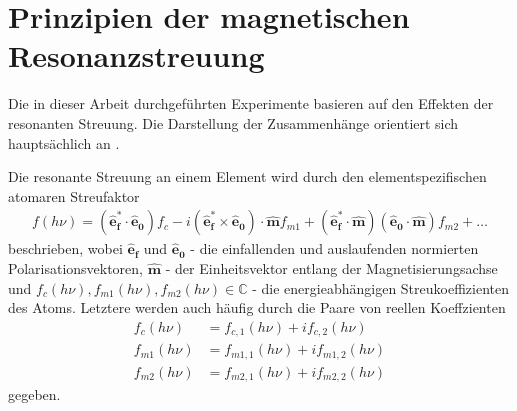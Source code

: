 \chapter{Prinzipien der magnetischen Resonanzstreuung}
\label{text:streuung}
Die in dieser Arbeit durchgeführten Experimente basieren auf den Effekten der resonanten Streuung. Die Darstellung der Zusammenhänge orientiert sich  hauptsächlich an \cite{kortright_resonant_2013}. 

\noindent
Die resonante Streuung an einem Element wird durch den elementspezifischen atomaren Streufaktor
\begin{align}
f(h\nu) = (\mathbf{\hat{e}_f^*} \cdot \mathbf{\hat{e}_0})f_c - i(\mathbf{\hat{e}_f^*} \times \mathbf{\hat{e}_0})\cdot\mathbf{\hat{m}}f_{m1} +  (\mathbf{\hat{e}_f^*} \cdot \mathbf{\hat{m}})(\mathbf{\hat{e}_0}\cdot\mathbf{\hat{m}})f_{m2} + \dots
\label{eq:atomfaktoren}
\end{align}
beschrieben, wobei $\mathbf{\hat{e}_f}$ und $\mathbf{\hat{e}_0}$ - die einfallenden und auslaufenden normierten Polarisationsvektoren, $\mathbf{\hat{m}}$ - der Einheitsvektor entlang der Magnetisierungsachse und $f_c(h\nu), f_{m1}(h\nu), f_{m2}(h\nu) \in \mathbb{C}$ - die energieabhängigen Streukoeffizienten des Atoms. Letztere werden auch häufig durch die Paare von reellen Koeffzienten
\begin{equation}
    \begin{split}
    f_c(h\nu) &= f_{c,1}(h\nu) + if_{c,2}(h\nu)\\
    f_{m1}(h\nu) &= f_{m1,1}(h\nu) + if_{m1,2}(h\nu)\\
    f_{m2}(h\nu) &= f_{m2,1}(h\nu) + if_{m2,2}(h\nu)
\end{split}
\label{eq:komplex_paar}
\end{equation}
gegeben.

